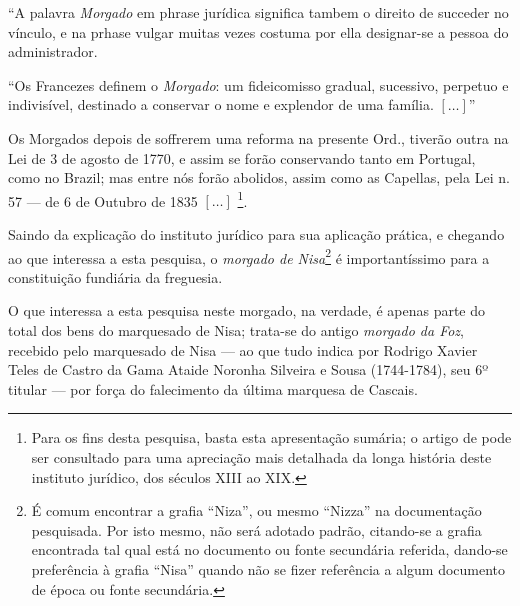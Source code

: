 \begin{citacao}
``A palavra \textit{Morgado} em phrase jurídica significa tambem o direito de succeder no vínculo, e na prhase vulgar muitas vezes costuma por ella designar-se a pessoa do administrador.

``Os Francezes definem o \textit{Morgado}: um fideicomisso gradual, sucessivo, perpetuo e indivisível, destinado a conservar o nome e explendor de uma família. \([\dots]\)''

Os Morgados depois de soffrerem uma reforma na presente Ord., tiverão outra na Lei de 3 de agosto de 1770, e assim se forão conservando tanto em Portugal, como no Brazil; mas entre nós forão abolidos, assim como as Capellas, pela Lei n. 57 --- de 6 de Outubro de 1835 \([\dots]\) \cite[p.~990]{ordfil_1870}\footnote{Para os fins desta pesquisa, basta esta apresentação sumária; o artigo de  pode ser consultado para uma apreciação mais detalhada da longa história deste instituto jurídico, dos séculos XIII ao XIX.}. 
\end{citacao}

Saindo da explicação do instituto jurídico para sua aplicação prática, e chegando ao que interessa a esta pesquisa, o \textit{morgado de Nisa}\footnote{É comum encontrar a grafia ``Niza'', ou mesmo ``Nizza'' na documentação pesquisada. Por isto mesmo, não será adotado padrão, citando-se a grafia encontrada tal qual está no documento ou fonte secundária referida, dando-se preferência à grafia ``Nisa'' quando não se fizer referência a algum documento de época ou fonte secundária.} é importantíssimo para a constituição fundiária da freguesia. 

O que interessa a esta pesquisa neste morgado, na verdade, é apenas parte do total dos bens do marquesado de Nisa; trata-se do antigo \textit{morgado da Foz}, recebido pelo marquesado de Nisa --- ao que tudo indica por Rodrigo Xavier Teles de Castro da Gama Ataide Noronha Silveira e Sousa (1744-1784), seu 6º titular \cite{wiki_nisa_2015} --- por força do falecimento da última marquesa de Cascais. 

